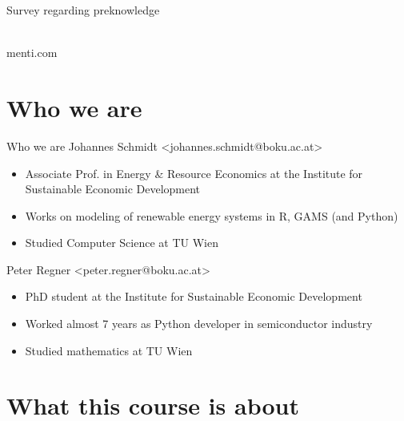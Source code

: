 
\subtitle{Introduction}
\date{2020-03-12}


\begin{frame}{Survey regarding preknowledge}
    \begin{center}
        \textcolor{black}{
        }\\
        \vspace{0.5cm}
        \huge{
            menti.com
        }
    \end{center}
\end{frame}

\begin{frame}

	\tableofcontents

\end{frame}

\section{Who we are}

\begin{frame}{Who we are}
    Johannes Schmidt <johannes.schmidt@boku.ac.at>\\
    \begin{itemize}
        \item Associate Prof. in Energy \& Resource Economics at the Institute for Sustainable Economic Development
        \item Works on modeling of renewable energy systems in R, GAMS (and Python)
        \item Studied Computer Science at TU Wien
    \end{itemize}

    \pause
    \bigskip

    Peter Regner <peter.regner@boku.ac.at>
    \begin{itemize}
        \item PhD student at the Institute for Sustainable Economic Development
        \item Worked almost 7 years as Python developer in semiconductor industry
        \item Studied mathematics at TU Wien
    \end{itemize}
\end{frame}

\section{What this course is about}

